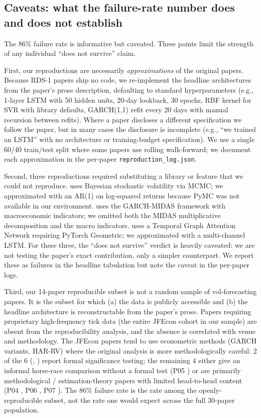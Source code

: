 \subsection{Caveats: what the failure-rate number does and does not establish}\label{sec:phase2_caveats}

The 86\% failure rate is informative but caveated. Three points limit the strength of any individual ``does not survive'' claim.

First, our reproductions are necessarily \emph{approximations} of the original papers. Because RDS-1 papers ship no code, we re-implement the headline architectures from the paper's prose description, defaulting to standard hyperparameters (e.g., 1-layer LSTM with 50 hidden units, 20-day lookback, 30 epochs, RBF kernel for SVR with library defaults, GARCH(1,1) refit every 20 days with manual recursion between refits). Where a paper discloses a different specification we follow the paper, but in many cases the disclosure is incomplete (e.g., ``we trained an LSTM'' with no architecture or training-budget specification). We use a single 60/40 train/test split where some papers use rolling walk-forward; we document each approximation in the per-paper \texttt{reproduction\_log.json}.

Second, three reproductions required substituting a library or feature that we could not reproduce. \citet{Kim2021} uses Bayesian stochastic volatility via MCMC; we approximated with an AR(1) on log-squared returns because PyMC was not available in our environment. \citet{ErsinBildirici2023} uses the GARCH-MIDAS framework with macroeconomic indicators; we omitted both the MIDAS multiplicative decomposition and the macro indicators. \citet{Kumar2024} uses a Temporal Graph Attention Network requiring PyTorch Geometric; we approximated with a multi-channel LSTM. For these three, the ``does not survive'' verdict is heavily caveated: we are not testing the paper's exact contribution, only a simpler counterpart. We report these as failures in the headline tabulation but note the caveat in the per-paper logs.

Third, our 14-paper reproducible subset is not a random sample of vol-forecasting papers. It is the subset for which (a) the data is publicly accessible and (b) the headline architecture is reconstructable from the paper's prose. Papers requiring proprietary high-frequency tick data (the entire JFEcon cohort in our sample) are absent from the reproducibility analysis, and the absence is correlated with venue and methodology. The JFEcon papers tend to use econometric methods (GARCH variants, HAR-RV) where the original analysis is more methodologically careful: 2 of the 6 (\citet{ChristensenSiggaardVeliyev2023}, \citet{Bucci2020}) report formal significance testing; the remaining 4 either give an informal horse-race comparison without a formal test (P05 \citet{Buccheri2021}) or are primarily methodological / estimation-theory papers with limited head-to-head content (P04 \citet{Bennedsen2022}, P06 \citet{Caporin2024}, P07 \citet{Hong2023}). The 86\% failure rate is the rate among the openly-reproducible subset, not the rate one would expect across the full 30-paper population.

